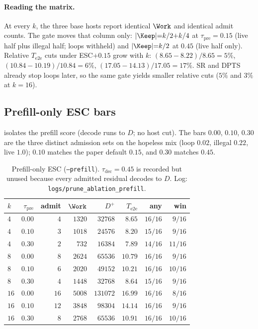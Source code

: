 \paragraph{Reading the matrix.}
At every $k$, the three base hosts report identical $\Work$ and identical admit counts.
The gate moves that column only: $|\Keep|{=}k/2{+}k/4$ at $\tau_{\mathrm{pre}}{=}0.15$
(live half plus illegal half; loops withheld) and $|\Keep|{=}k/2$ at $0.45$
(live half only).
Relative $T_{\mathrm{e2e}}$ cuts under ESC${+}0.15$ grow with $k$:
$(8.65{-}8.22)/8.65{=}5\%$,
$(10.84{-}10.19)/10.84{=}6\%$,
$(17.05{-}14.13)/17.05{=}17\%$.
SR and DPTS already stop loops later, so the same gate yields smaller relative cuts
($5\%$ and $3\%$ at $k{=}16$).

\subsection{Prefill-only ESC bars}
\label{sec:ablate-prefill}

 isolates the prefill score (decode runs to $D$; no host cut).
The bars $0.00$, $0.10$, $0.30$ are the three distinct admission sets on the hopeless mix
(loop $0.02$, illegal $0.22$, live $1.0$); $0.10$ matches the paper default $0.15$,
and $0.30$ matches $0.45$.

\begin{table}[t]
\centering
\caption{Prefill-only ESC (\texttt{--prefill}).
$\tau_{\mathrm{dec}}{=}0.45$ is recorded but unused because every admitted residual decodes to $D$.
Log: \texttt{logs/prune\_ablation\_prefill}.}
\label{tab:ablate-prefill}
\scriptsize
\setlength{\tabcolsep}{3.0pt}
\begin{tabular}{@{}lrrrrrrr@{}}
\toprule
$k$ & $\tau_{\mathrm{pre}}$ & admit & $\Work$ & $D^{+}$ & $T_{\mathrm{e2e}}$ & any & win \\
\midrule
$4$ & $0.00$ & $4$ & $1320$ & $32768$ & $8.65$ & $16/16$ & $9/16$ \\
\rowcolor{tblalt}
$4$ & $0.10$ & $3$ & $1018$ & $24576$ & $8.20$ & $15/16$ & $9/16$ \\
$4$ & $0.30$ & $2$ & $732$ & $16384$ & $7.89$ & $14/16$ & $11/16$ \\
\midrule
$8$ & $0.00$ & $8$ & $2624$ & $65536$ & $10.79$ & $16/16$ & $9/16$ \\
\rowcolor{tblalt}
$8$ & $0.10$ & $6$ & $2020$ & $49152$ & $10.21$ & $16/16$ & $10/16$ \\
$8$ & $0.30$ & $4$ & $1448$ & $32768$ & $8.64$ & $15/16$ & $9/16$ \\
\midrule
$16$ & $0.00$ & $16$ & $5008$ & $131072$ & $16.99$ & $16/16$ & $8/16$ \\
\rowcolor{tblalt}
$16$ & $0.10$ & $12$ & $3848$ & $98304$ & $14.14$ & $16/16$ & $9/16$ \\
$16$ & $0.30$ & $8$ & $2768$ & $65536$ & $10.91$ & $16/16$ & $10/16$ \\
\bottomrule
\end{tabular}
\end{table}

